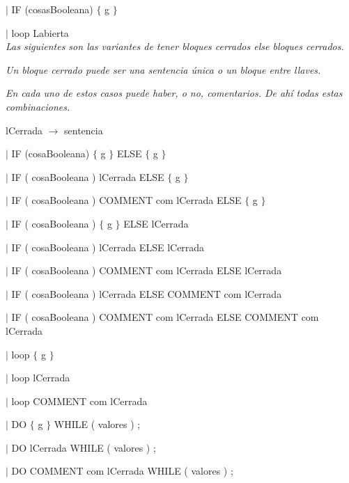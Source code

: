 \hspace{15mm}$|$ IF (cosasBooleana) $\{$ g $\}$ 

\hspace{15mm}$|$ loop Labierta \\

\textit{Las siguientes son las variantes de tener bloques cerrados else bloques cerrados.}

\textit{Un bloque cerrado puede ser una sentencia única o un bloque entre llaves.}

\textit{En cada uno de estos casos puede haber, o no, comentarios. De ahí todas estas combinaciones.} 


lCerrada $\rightarrow$ sentencia

\hspace{15mm}$|$ IF (cosaBooleana) $\{$ g $\}$ ELSE $\{$ g $\}$

\hspace{15mm}$|$ IF ( cosaBooleana ) lCerrada ELSE $\{$ g $\}$ 

\hspace{15mm}$|$ IF ( cosaBooleana ) COMMENT com lCerrada ELSE $\{$ g $\}$ 

\hspace{15mm}$|$ IF ( cosaBooleana ) $\{$ g $\}$ ELSE lCerrada 

\hspace{15mm}$|$ IF ( cosaBooleana ) lCerrada ELSE lCerrada 

\hspace{15mm}$|$ IF ( cosaBooleana ) COMMENT com lCerrada ELSE lCerrada 

\hspace{15mm}$|$ IF ( cosaBooleana ) lCerrada ELSE  COMMENT com lCerrada 

\hspace{15mm}$|$ IF ( cosaBooleana ) COMMENT com lCerrada ELSE  COMMENT com lCerrada

\hspace{15mm}$|$ loop $\{$ g $\}$ 

\hspace{15mm}$|$ loop lCerrada 

\hspace{15mm}$|$ loop COMMENT com lCerrada

\hspace{15mm}$|$ DO $\{$ g $\}$ WHILE ( valores ) ;
  
\hspace{15mm}$|$ DO lCerrada WHILE ( valores ) ;  
  
\hspace{15mm}$|$  DO COMMENT com lCerrada WHILE ( valores ) ;

